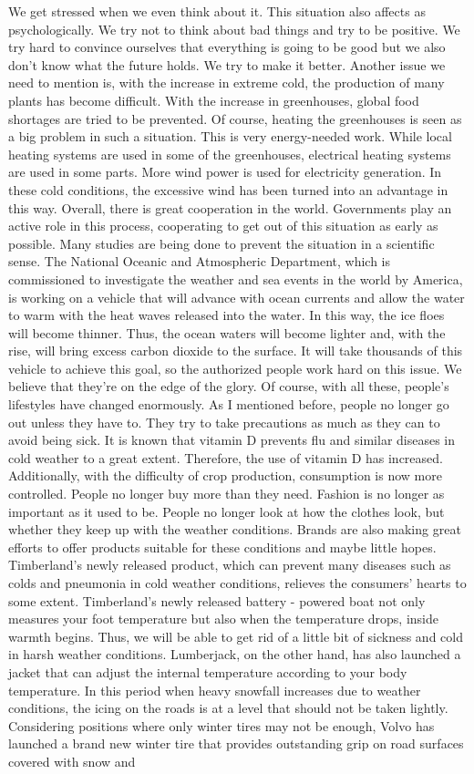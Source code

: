 \documentclass[]{book}
\begin{document}
We get stressed when we even think about it. This situation also affects as psychologically. We try not to think about bad things and try to be positive. We try hard to convince ourselves that everything is going to be good but we also don't know what the future holds. We try to make it better. Another issue we need to mention is, with the increase in extreme cold, the production of many plants has become difficult. With the increase in greenhouses, global food shortages are tried to be prevented. Of course, heating the greenhouses is seen as a big problem in such a situation. This is very energy-needed work. While local heating systems are used in some of the greenhouses, electrical heating systems are used in some parts. More wind power is used for electricity generation. In these cold conditions, the excessive wind has been turned into an advantage in this way. Overall, there is great cooperation in the world. Governments play an active role in this process, cooperating to get out of this situation as early as possible. Many studies are being done to prevent the situation in a scientific sense. The National Oceanic and Atmospheric Department, which is commissioned to investigate the weather and sea events in the world by America, is working on a vehicle that will advance with ocean currents and allow the water to warm with the heat waves released into the water. In this way, the ice floes will become thinner. Thus, the ocean waters will become lighter and, with the rise, will bring excess carbon dioxide to the surface. It will take thousands of this vehicle to achieve this goal, so the authorized people work hard on this issue. We believe that they're on the edge of the glory. Of course, with all these, people's lifestyles have changed enormously. As I mentioned before, people no longer go out unless they have to. They try to take precautions as much as they can to avoid being sick. It is known that vitamin D prevents flu and similar diseases in cold weather to a great extent. Therefore, the use of vitamin D has increased. Additionally, with the difficulty of crop production, consumption is now more controlled. People no longer buy more than they need. Fashion is no longer as important as it used to be. People no longer look at how the clothes look, but whether they keep up with the weather conditions. Brands are also making great efforts to offer products suitable for these conditions and maybe little hopes. Timberland's newly released product, which can prevent many diseases such as colds and pneumonia in cold weather conditions, relieves the consumers' hearts to some extent. Timberland's newly released battery - powered boat not only measures your foot temperature but also when the temperature drops, inside warmth begins. Thus, we will be able to get rid of a little bit of sickness and cold in harsh weather conditions. Lumberjack, on the other hand, has also launched a jacket that can adjust the internal temperature according to your body temperature. In this period when heavy snowfall increases due to weather conditions, the icing on the roads is at a level that should not be taken lightly. Considering positions where only winter tires may not be enough, Volvo has launched a brand new winter tire that provides outstanding grip on road surfaces covered with snow and 
\end{document}
